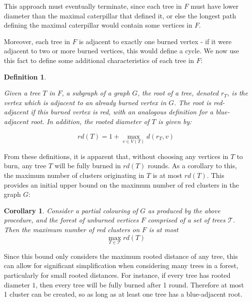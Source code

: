 \documentclass{mpaper}
\newtheorem{definition}{Definition}[section]
\newtheorem{corollary}{Corollary}[section]
\begin{document}
This approach must eventually terminate, since each tree in $F$ must have lower diameter than the maximal caterpillar that defined it, or else the longest path defining the maximal caterpillar would contain some vertices in $F$.


Moreover, each tree in $F$ is adjacent to exactly one burned vertex - if it were adjacent to two or more burned vertices, this would define a cycle. We now use this fact to define some additional characteristics of each tree in $F$:

\begin{definition}
\label{def/roots}

Given a tree $T$ in $F$, a subgraph of a graph $G$, the \emph{root} of a tree, denoted $r_T$, is the vertex which is adjacent to an already burned vertex in $G$. The root is \emph{red-adjacent} if this burned vertex is red, with an analogous definition for a \emph{blue-adjacent} root. In addition, the \emph{rooted diameter} of $T$ is given by:

\begin{equation*}
rd(T) = 1 + \max_{v \in V(T)} d(r_{T},v)
\end{equation*} 

\end{definition}

From these definitions, it is apparent that, without choosing any vertices in $T$ to burn, any tree $T$ will be fully burned in $rd(T)$ rounds. As a corollary to this, the maximum number of clusters originating in $T$ is at most $rd(T)$. This provides an initial upper bound on the maximum number of red clusters in the graph $G$:

\begin{corollary}
\label{cor/root-diameter-bound-1}
Consider a partial colouring of $G$ as produced by the above procedure, and the forest of unburned vertices $F$ comprised of a set of trees $\mathcal{T}$. Then the maximum number of red clusters on $F$ is at most $$\max_{T \in \mathcal{T}} rd(T)$$
\end{corollary}

Since this bound only considers the maximum rooted distance of any tree, this can allow for significant simplification when considering many trees in a forest, particularly for small rooted distances. For instance, if every tree has rooted diameter $1$, then every tree will be fully burned after 1 round. Therefore at most 1 cluster can be created, so as long as at least one tree has a blue-adjacent root.
\end{document}
